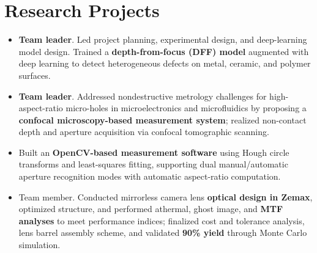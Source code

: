 \documentclass{resume}
\begin{document}
\section{Research Projects}

\begin{itemize}[parsep=0.5ex]
  \item \textbf{Team leader}. Led project planning, experimental design, and deep-learning model design. Trained a \textbf{depth-from-focus (DFF) model} augmented with deep learning to detect heterogeneous defects on metal, ceramic, and polymer surfaces.
\end{itemize}


\begin{itemize}[parsep=0.5ex]
\item \textbf{Team leader}. Addressed nondestructive metrology challenges for high-aspect-ratio micro-holes in microelectronics and microfluidics by proposing a \textbf{confocal microscopy-based measurement system}; realized non-contact depth and aperture acquisition via confocal tomographic scanning.
\item Built an \textbf{OpenCV-based measurement software} using Hough circle transforms and least-squares fitting, supporting dual manual/automatic aperture recognition modes with automatic aspect-ratio computation.
\end{itemize}

\begin{itemize}[parsep=0.5ex]
\item Team member. Conducted mirrorless camera lens \textbf{optical design in Zemax}, optimized structure, and performed athermal, ghost image, and \textbf{MTF analyses} to meet performance indices; finalized cost and tolerance analysis, lens barrel assembly scheme, and validated \textbf{90\% yield} through Monte Carlo simulation.
\end{itemize}
\end{document}

